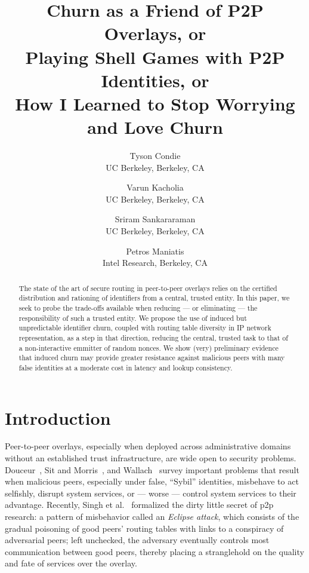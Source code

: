 \documentclass[11pt,twocolumn]{MyTightStyle}
\begin{document}
\title{Churn as a Friend of P2P Overlays, or\\
Playing Shell Games with P2P Identities, or\\
How I Learned to Stop Worrying and Love Churn}

\author{
Tyson Condie\\
\small{UC Berkeley, Berkeley, {CA}}
\and
Varun Kacholia\\
\small{UC Berkeley, Berkeley, {CA}}
\and
Sriram Sankararaman\\
\small{UC Berkeley, Berkeley, {CA}}
\and
Petros Maniatis\\
\small{Intel Research, Berkeley, {CA}}
}

\maketitle

\begin{abstract}
The state of the art of secure routing in peer-to-peer overlays relies
on the certified distribution and rationing of identifiers from a
central, trusted entity.  In this paper, we seek to probe the trade-offs
available when reducing --- or eliminating --- the responsibility of such
a trusted entity.  We propose the use of induced but unpredictable
identifier churn, coupled with routing table diversity in IP network
representation, as a step in that direction, reducing the central,
trusted task to that of a non-interactive emmitter of random nonces.  We
show (very) preliminary evidence that induced churn may provide greater
resistance against malicious peers with many false identities at a
moderate cost in latency and lookup consistency.
\end{abstract}


\section{Introduction}
\label{sec:introduction}
Peer-to-peer overlays, especially when deployed across administrative
domains without an established trust infrastructure, are wide open to
security problems.  Douceur~\cite{Douceur2002short}, Sit and
Morris~\cite{Sit2002short}, and Wallach~\cite{Wallach2002short} survey
important problems that result when malicious peers, especially under
false, ``Sybil'' identities, misbehave to act selfishly, disrupt system services,
or --- worse --- control system services to their advantage.  
Recently, Singh et al.~\cite{Singh2004short} formalized the dirty little
secret of p2p research: a pattern of misbehavior called an \emph{Eclipse
attack}, which consists of the gradual poisoning of good peers' routing
tables with links to a conspiracy of adversarial peers; left unchecked,
the adversary eventually controls most communication between good
peers, thereby placing a stranglehold on the quality and fate of 
services over the overlay.
\end{document}
